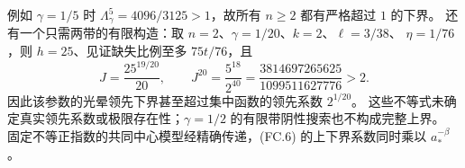 例如 $\gamma=1/5$ 时 $\Lambda_\gamma^5=4096/3125>1$，故所有 $n\ge2$ 都有严格超过 $1$ 的下界。
还有一个只需两带的有限构造：取 $n=2$、$\gamma=1/20$、$k=2$、$\ell=3/38$、
$\eta=1/76$，则 $h=25$、见证缺失比例至多 $75t/76$，且
\[
 J=\frac{25^{19/20}}{20},\qquad
 J^{20}=\frac{5^{18}}{2^{40}}=
 \frac{3814697265625}{1099511627776}>2.\tag{FC.8}
\]
因此该参数的光晕领先下界甚至超过集中函数的领先系数 $2^{1/20}$。
这些不等式未确定真实领先系数或极限存在性；$\gamma=1/2$ 的有限带阴性搜索也不构成完整上界。
固定不等正指数的共同中心模型经精确传递，(FC.6) 的上下界系数同时乘以 $a_*^{-\beta}$。
